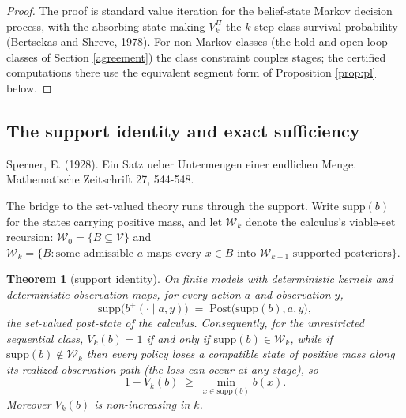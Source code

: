 \documentclass[10pt,twocolumn]{article}
\theoremstyle{plain}
\newtheorem{theorem}{Theorem}
\theoremstyle{definition}
\theoremstyle{remark}
\begin{document}
\begin{proof}
The proof is standard value iteration for the belief-state Markov decision
process, with the absorbing state making \(V^{\Pi}_{k}\) the \(k\)-step
class-survival probability (Bertsekas and Shreve, 1978). For non-Markov
classes (the hold and open-loop classes of Section \ref{agreement}) the
class constraint couples stages; the certified computations there use the
equivalent segment form of Proposition \ref{prop:pl} below.
\end{proof}

\subsection{The support identity and exact sufficiency}\label{support}
Sperner, E. (1928). Ein Satz ueber Untermengen einer endlichen Menge.
Mathematische Zeitschrift 27, 544-548.


The bridge to the set-valued theory runs through the support. Write
\(\mathrm{supp}(b)\) for the states carrying positive mass, and let
\(\mathcal{W}_{k}\) denote the calculus's viable-set recursion:
\(\mathcal{W}_{0} = \{B \subseteq \mathcal{V}\}\) and
\(\mathcal{W}_{k} = \{B : \text{some admissible } a \text{ maps every }
x \in B \text{ into } \mathcal{W}_{k-1}\text{-supported posteriors}\}\).

\begin{theorem}[support identity]\label{thm:support}
On finite models with deterministic kernels and deterministic
observation maps, for every action \(a\) and
observation \(y\),
\[
\mathrm{supp}\bigl(b^{+}(\cdot \mid a, y)\bigr)
\;=\; \mathrm{Post}\bigl(\mathrm{supp}(b), a, y\bigr),
\]
the set-valued post-state of the calculus. Consequently, for the
unrestricted sequential class,
\(V_{k}(b) = 1\) if and only if
\(\mathrm{supp}(b) \in \mathcal{W}_{k}\), while if
\(\mathrm{supp}(b) \notin \mathcal{W}_{k}\) then every policy loses a
compatible state of positive mass along its realized observation path
(the loss can occur at any stage), so
\[
1 - V_{k}(b) \;\ge\; \min_{x \in \mathrm{supp}(b)} b(x).
\]
Moreover \(V_{k}(b)\) is non-increasing in \(k\).\end{theorem}
\end{document}
